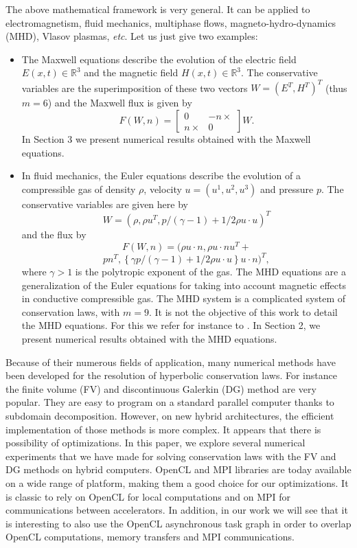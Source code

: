 \documentclass[12pt]{amsart}
\begin{document}
The above mathematical framework is very general. It can be applied  to electromagnetism, fluid mechanics, multiphase flows, magneto-hydro-dynamics (MHD), Vlasov plasmas, \emph{etc}. Let us just give two examples:
\begin{itemize}
\item The Maxwell equations describe the evolution of the electric field $E(x,t)\in \mathbb{R}^3$ and the magnetic field $H(x,t)\in \mathbb{R}^3$. The conservative variables are the superimposition of these two vectors $W=(E^T,H^T)^T$ (thus $m=6$) and the Maxwell flux is given by $$F(W,n)=\left[\begin{array}{cc}
0 & -n\times\\
n\times & 0
\end{array}\right]W. $$
In Section 3 we present numerical results obtained with the Maxwell equations.
\item In fluid mechanics, the Euler equations describe the evolution of a compressible gas of density $\rho$, velocity $u=(u^1,u^2,u^3)$ and pressure $p$. The conservative variables are given here by $$W=(\rho,\rho u^T,p/(\gamma-1)+1/2 \rho u\cdot u)^T$$ and the flux by $$ F(W,n)=(\rho u \cdot n, \rho u\cdot n u^T + $$ $$p n^T,\left\{ \gamma p/(\gamma-1)+1/2 \rho u\cdot u \right\} u\cdot n)^T,$$where $\gamma>1$ is the polytropic exponent of the gas. The MHD equations are a generalization of the Euler equations for taking into account magnetic effects in conductive compressible gas. The MHD system is a complicated system of conservation laws, with $m=9$. It is not the objective of this work to detail the MHD equations. For this we refer for instance to \cite{massaro2014numerical}. In Section 2, we present numerical results obtained with the MHD equations.
\end{itemize}

Because of their numerous fields of application, many numerical methods have been developed for the resolution of hyperbolic conservation laws. For instance the finite volume (FV) and discontinuous Galerkin (DG) method are very popular. They are easy to program on a standard parallel computer thanks to subdomain decomposition. However, on new hybrid architectures, the efficient implementation of those methods is more complex. It appears that there is possibility of optimizations. In this paper, we explore several numerical experiments that we have made for solving conservation laws with the FV and DG methods on hybrid computers. OpenCL and MPI libraries are today available on a wide range of platform, making them a good choice for our optimizations.
It is classic to rely on OpenCL for local computations and on MPI for communications between accelerators. In addition, in our work we will see that it is interesting to also use the OpenCL asynchronous task graph in order to overlap OpenCL computations, memory transfers and MPI communications.
\end{document}
